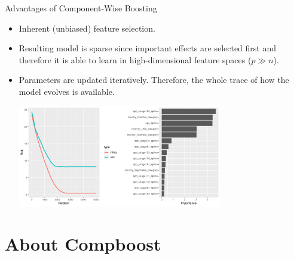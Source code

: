 \documentclass[10pt]{beamer}\usepackage[]{graphicx}\usepackage[]{color}
\newenvironment{knitrout}{}{} %
\begin{document}
\begin{frame}{Advantages of Component-Wise Boosting}

  \begin{itemize}

    \item
      Inherent (unbiased) feature selection.

    \item
      Resulting model is sparse since important effects are selected first and therefore it is able to learn in high-dimensional feature spaces ($p \gg n$).

    \item
      Parameters are updated iteratively. Therefore, the whole trace of how the model evolves is available. \vspace{0.3cm}



\begin{knitrout}
\color{fgcolor}

{\centering \includegraphics[width=0.7\textwidth]{figure/unnamed-chunk-5-1} 

}



\end{knitrout}



  \end{itemize}

\end{frame}




\section{About Compboost}
\end{document}
